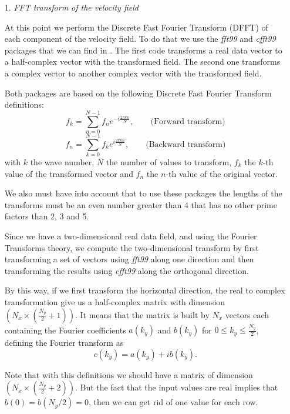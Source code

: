 \begin{itemize}
\item[1.]\textit{FFT transform of the velocity field}

At this point we perform the Discrete Fast Fourier Transform (DFFT) of each component of the velocity field. To do that we use the \textit{fft99} and \textit{cfft99} packages that we can find in \cite{orlandi_fluid_2012}. The first code transforms a real data vector to a half-complex vector with the transformed field. The second one transforms a complex vector to another complex vector with the transformed field.

Both packages are based on the following Discrete Fast Fourier Transform definitions:
\begin{equation*}
\label{1.12.1}
f_k=\sum_{n=0}^{N-1}f_ne^{-i\frac{2\pi kn}{N}},\quad\quad\mbox{(Forward transform)}
\end{equation*}
\begin{equation*}
\label{1.12.2}
f_n=\sum_{k=0}^{N-1}f_ke^{i\frac{2\pi kn}{N}},\quad\quad\mbox{(Backward transform)}
\end{equation*}
with $k$ the wave number, $N$ the number of values to transform, $f_k$ the $k$-th value of the transformed vector and $f_n$ the $n$-th value of the original vector.

We also must have into account that to use these packages the lengths of the transforms must be an even number greater than 4 that has no other prime factors than 2, 3 and 5.

Since we have a two-dimensional real data field, and using the Fourier Transforms theory, we compute the two-dimensional transform by first transforming a set of vectors using \textit{fft99} along one direction and then transforming the results using \textit{cfft99} along the orthogonal direction.

By this way, if we first transform the horizontal direction, the real to complex transformation give us a half-complex matrix with dimension $\left(N_x\times\left(\frac{N_y}{2}+1\right)\right)$. It means that the matrix is built by $N_x$ vectors each containing the Fourier coefficients $a(k_y)$ and $b(k_y)$ for $0\leq k_y\leq \frac{N_y}{2}$, defining the Fourier transform as
$$c(k_y)=a(k_y)+ib(k_y).$$

Note that with this definitions we should have a matrix of dimension $\left(N_x\times\left(\frac{N_y}{2}+2\right)\right)$. But the fact that the input values are real implies that $b(0)=b(N_y/2)=0$, then we can get rid of one value for each row.


\end{itemize}
